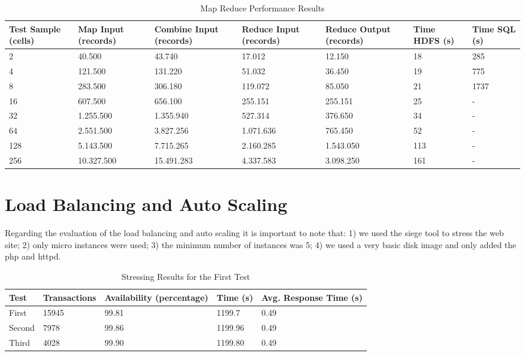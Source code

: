 \documentclass{article}
\begin{document}
\begin{table}[htbp!]
\begin{center}
\caption{Map Reduce Performance Results}
\begin{tabular}{| p{2cm} | p{2cm} | p{2cm} | p{2cm}| p{2cm} | p{2cm} | p{2cm} |}
\hline
Test Sample (cells) & Map Input (records) & Combine Input (records) & Reduce Input (records) & Reduce Output (records) & Time HDFS (s) & Time SQL (s)\\ \hline
2 & 40.500 & 43.740 & 17.012 & 12.150 & 18 & 285 \\ \hline
4 & 121.500 & 131.220 & 51.032 & 36.450 & 19 & 775 \\ \hline
8 & 283.500 & 306.180 & 119.072 & 85.050 & 21 & 1737 \\ \hline
16 & 607.500 & 656.100 & 255.151 & 255.151 & 25 & - \\ \hline
32 & 1.255.500 & 1.355.940 & 527.314 & 376.650 & 34 & -\\ \hline
64 & 2.551.500 & 3.827.256 & 1.071.636 & 765.450 & 52  & -\\ \hline
128 & 5.143.500 & 7.715.265 & 2.160.285 & 1.543.050 & 113 & -\\ \hline
256 & 10.327.500 & 15.491.283 & 4.337.583 & 3.098.250 & 161 & -\\ \hline
\end{tabular}
\end{center}
\label{map_reduce_test}
\end{table}

\section{Load Balancing and Auto Scaling}

Regarding the evaluation of the load balancing and auto scaling it is important to note that: 1) we used the siege tool to stress the web site; 2) only micro instances were used; 3) the minimum number of instances was 5; 4) we used a very basic disk image and only added the php and httpd.

\begin{table}[htbp!]
\begin{center}
\caption{Stressing Results for the First Test}
\begin{tabular}{| l | l | l | l | l | }
\hline
Test & Transactions & Availability (percentage) & Time (s) & Avg. Response Time (s) \\ \hline
First & 15945 & 99.81 & 1199.7 & 0.49 \\ \hline
Second & 7978 & 99.86 & 1199.96 & 0.49 \\ \hline
Third & 4028 & 99.90 & 1199.80 & 0.49 \\ \hline
\end{tabular}
\end{center}
\label{map_reduce_test}
\end{table}
\end{document}
